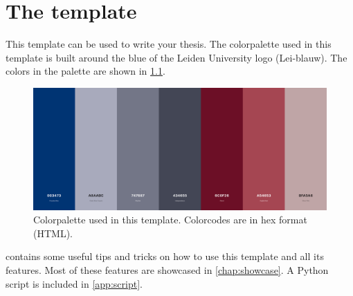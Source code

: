 
\chapter{The template}
\label{chap:template}
This template can be used to write your thesis. The colorpalette used in this template is built around the blue of the Leiden University logo (Lei-blauw). The colors in the palette are shown in \cref{fig:template}.

\begin{figure}[!h]
	\centering
	\includegraphics[width=\textwidth]{layout/figures/palette.PNG}
	\caption[Colorpalette (short caption)]{Colorpalette used in this template. Colorcodes are in hex format (HTML).}
	\label{fig:template}
\end{figure}
\noindent
{} contains some useful tips and tricks on how to use this template and all its features. Most of these features are showcased in \cref{chap:showcase}. A Python script is included in \cref{app:script}.

